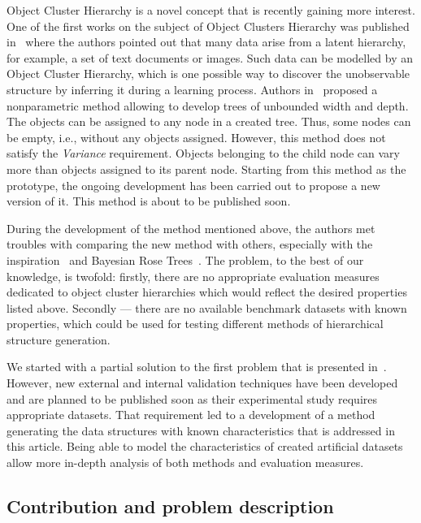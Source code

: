 \documentclass{article}
\begin{document}
Object Cluster Hierarchy is a novel concept that is recently gaining more interest. One of the first works on the subject of Object Clusters Hierarchy was published in~\cite{ghahramani2010tree} where the authors pointed out that many data arise from a latent hierarchy, for example, a set of text documents or images. Such data can be modelled by an Object Cluster Hierarchy, which is one possible way to discover the unobservable structure by inferring it during a learning process. Authors in~\cite{ghahramani2010tree} proposed a nonparametric method allowing to develop trees of unbounded width and depth. The objects can be assigned to any node in a created tree. Thus, some nodes can be empty, i.e., without any objects assigned. However, this method does not satisfy the \textit{Variance} requirement. Objects belonging to the child node can vary more than objects assigned to its parent node. Starting from this method as the prototype, the ongoing development has been carried out to propose a new version of it. This method is about to be published soon.

    During the development of the method mentioned above, the authors met troubles with comparing the new method with others, especially with the inspiration~\cite{ghahramani2010tree} and Bayesian Rose Trees~\cite{DBLP:journals/corr/abs-1203-3468}. The problem, to the best of our knowledge, is twofold: firstly, there are no appropriate evaluation measures dedicated to object cluster hierarchies which would reflect the desired properties listed above. Secondly --- there are no available benchmark datasets with known properties, which could be used for testing different methods of hierarchical structure generation.
    
We started with a partial solution to the first problem that is presented in~\cite{Spytkowski2016}. However, new external and internal validation techniques have been developed and are planned to be published soon as their experimental study requires appropriate datasets. That requirement led to a development of a method generating the data structures with known characteristics that is addressed in this article. Being able to model the characteristics of created artificial datasets allow more in-depth analysis of both methods and evaluation measures.

\subsection{Contribution and problem description}
\end{document}
